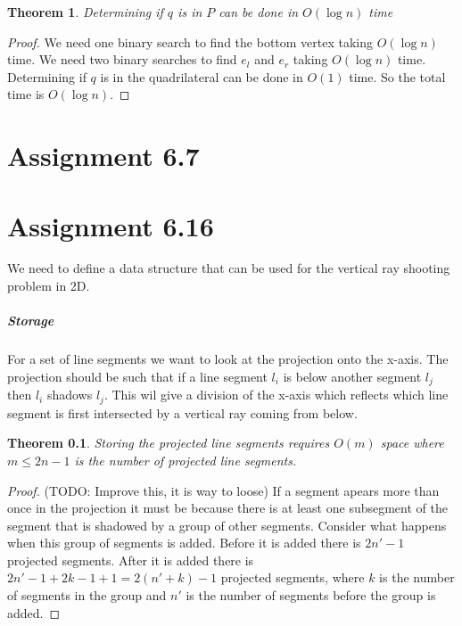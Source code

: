 \documentclass[10pt,a4paper,final,oneside,openany,article]{memoir}
\newtheorem{pinQtime}[pinQ]{Theorem}
\newtheorem{rayshooting}{Theorem}
\begin{document}
\begin{pinQtime}
  Determining if $q$ is in $P$ can be done in $O(\log n)$ time
\end{pinQtime}

\begin{proof}
  We need one binary search to find the bottom vertex taking $O(\log n)$ time. We need two binary searches to find $e_l$ and $e_r$ taking $O(\log n)$ time. Determining if $q$ is in the quadrilateral can be done in $O(1)$ time. So the total time is $O(\log n)$.
\end{proof}

\chapter*{Assignment 6.7}

\chapter*{Assignment 6.16}
We need to define a data structure that can be used for the vertical ray shooting problem in 2D.

\paragraph{Storage}
For a set of line segments we want to look at the projection onto the x-axis. The projection should be such that if a line segment $l_i$ is below another segment $l_j$ then $l_i$ shadows $l_j$. This wil give a division of the x-axis which reflects which line segment is first intersected by a vertical ray coming from below. 

\begin{rayshooting}
  Storing the projected line segments requires $O(m)$ space where $m \le 2n-1$ is the number of projected line segments.
\end{rayshooting}
\begin{proof}(TODO: Improve this, it is way to loose)
  If a segment apears more than once in the projection it must be because there is at least one subsegment of the segment that is shadowed by a group of other segments. Consider what happens when this group of segments is added. Before it is added there is $2n'-1$ projected segments. After it is added there is $2n'-1 + 2k-1 + 1 = 2(n'+k)-1$ projected segments, where $k$ is the number of segments in the group and $n'$ is the number of segments before the group is added.
\end{proof}
\end{document}
